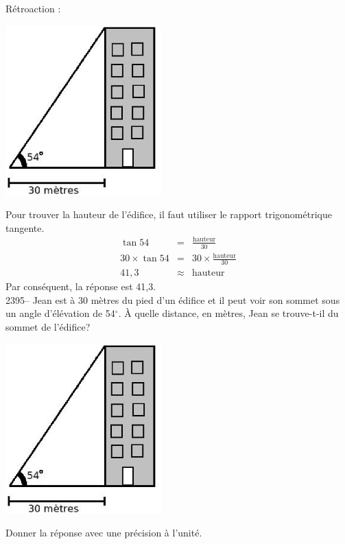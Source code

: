 \documentclass[letterpaper, 12pt]{article}
\begin{document}
R\'etroaction :\\
\begin{center}
 \includegraphics[width=6cm,bb=14 14 320 339]{Q2394.eps}
\end{center}
Pour trouver la hauteur de l'\'edifice, il faut utiliser le rapport trigonom\'etrique tangente.
\begin{eqnarray*}
\tan{54}&=&\frac{\textrm{hauteur}}{30}\\[2mm]
30\times \tan{54}&=&30\times\frac{\textrm{hauteur}}{30}\\[2mm]
41,3&\approx&\textrm{hauteur}
\end{eqnarray*}
Par cons\'equent, la r\'eponse est 41,3.\\

2395-- Jean est \`a 30 m\`etres du pied d'un \'edifice et il peut voir son sommet sous un angle d'\'el\'evation de 54$^{\circ}$. \`A quelle distance, en m\`etres, Jean se trouve-t-il du sommet de l'\'edifice?\\
\begin{center}
 \includegraphics[width=6cm,bb=14 14 320 339]{Q2394.eps}
\end{center}
Donner la r\'eponse avec une pr\'ecision \`a l'unit\'e.\\
\end{document}
